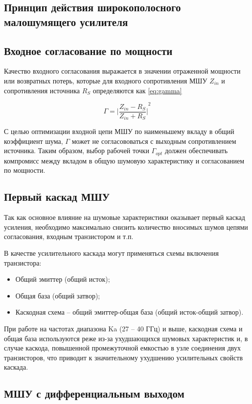\subsection{Принцип действия широкополосного малошумящего усилителя}

\subsection{Входное согласование по мощности}
Качество входного согласования выражается в значении отраженной мощности или возвратных потерь, которые для входного сопротивления МШУ \(Z_{in}\) и сопротивления источника \(R_S\) определяются как \eqref{eq:gamma}

\begin{equation}
\label{eq:gamma}
\Gamma = {\Bigg| \frac{Z_{in} - R_S}{Z_{in} + R_S} \Bigg|}^2
\end{equation}

С целью оптимизации входной цепи МШУ по наименьшему вкладу в общий коэффициент шума, \(\Gamma\) может не согласововаться с выходным сопротивлением источника. Таким образом, выбор рабочей точки \(\Gamma_{opt}\) должен обеспечивать компромисс между вкладом в общую шумовую характеристику и согласованием по мощности.

\subsection{Первый каскад МШУ}
Так как основное влияние на шумовые характеристики оказывает первый каскад усиления, необходимо максимально снизить количество вносимых шумов цепями согласования, входным транзистором и т.п.

В качестве усилительного каскада могут применяться схемы включения транзистора:
\begin{itemize}
	\item Общий эмиттер (общий исток);
	\item Общая база (общий затвор);
	\item Каскодная схема -- общий эмиттер-общая база (общий исток-общий затвор).
\end{itemize}

При работе на частотах диапазона Ka (27 -- 40 ГГц) и выше, каскодная схема и общая база используются реже из-за ухудшающихся шумовых характеристик и, в случае каскода, повышенной промежуточной емкостью в узле соединения двух транзисторов, что приводит к значительному ухудшению усилительных свойств каскада.

\subsection{МШУ с дифференциальным выходом}

